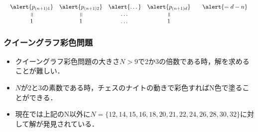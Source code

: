 \begin{frame}
\begin{exampleblock}{}
\begin{displaymath}
\begin{array}{ccccc}
\begin{array}{cccc}
                \alert{p_{(n+1)1}}&\alert{p_{(n+1)2}}&\alert{\dots}&\alert{p_{(n+1)d}} \\
                \rotatebox[origin=c]{-90}{$=$}&\rotatebox[origin=c]{-90}{$=$}&\dots & \rotatebox[origin=c]{-90}{$=$}\\
                1&1&\dots&1
                \end{array}& \begin{array}{c}\alert{=d-n}\\ \\ \\ \end{array}
            \end{array}
        \end{displaymath}
    \end{exampleblock}
\end{frame}



\begin{frame}
    \frametitle{クイーングラフ彩色問題}
    \begin{itemize}
        \item クイーングラフ彩色問題の大きさ$N>9$で2か3の倍数である時，解を求めることが難しい．
        \item $N$が2と3の素数である時，チェスのナイトの動きで彩色すればN色で塗ることができる．
        \item 現在では上記のN以外に$N=\{12, 14, 15, 16, 18, 20, 21, 22, 24, 26, 28, 30, 32\}$に対して解が発見されている．
    \end{itemize}

\end{frame}
\backupend

